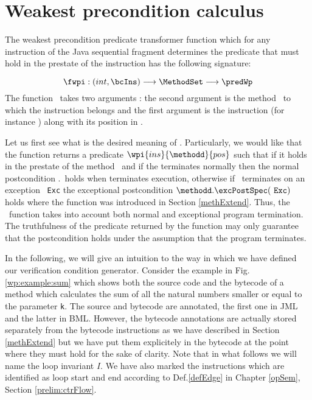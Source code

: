  


\section{Weakest precondition calculus} \label{wpRules}


The weakest precondition predicate transformer function which for any instruction of the Java sequential fragment
determines the predicate that must hold in the prestate of the instruction has the following signature:

$$ \fwpi :   (int,\bcIns)  \longrightarrow   \MethodSet   \longrightarrow \predWp $$
The function \fwpi \ takes two arguments : 
the second argument is the method \methodd \ to which the  instruction belongs
and  the first argument is  the instruction (for instance  \putfield) along with its position in \methodd.

Let us first see what is the desired meaning of \fwpi.
Particularly, we would like that the function \fwpi{}  returns a predicate $\wpi{ins}{\methodd}{pos}$
such that  if it holds in the prestate of the method \methodd \  and if the
\methodd{} terminates normally then the normal postcondition \methodd.\normalPost \ holds when 
\methodd{} terminates execution, otherwise if \methodd \ terminates on an exception
\mbox{ \rm \texttt{Exc}} the exceptional postcondition  $\methodd.\excPostSpec(\mbox{ \rm \texttt{Exc}})$ holds where the function \excPostSpec{} was
introduced in Section \ref{methExtend}. Thus, the \fwpi \ function takes into account both normal and exceptional
program termination. The truthfulness of the predicate returned by the \fwpi{} function
may only guarantee that the postcondition holds under the assumption that the program terminates.
 
 In the following, we will give an intuition to the way in which we have defined our verification condition generator.
 Consider the example in Fig. \ref{wp:example:sum} which 
 shows both the source code and the bytecode of a method which calculates the sum of all the natural numbers
 smaller or equal to the parameter \lstinline!k!. The source and bytecode are annotated, the first one in JML and the latter in BML.
 However, the bytecode annotations are actually stored separately from the bytecode instructions as we have described in Section \ref{methExtend}
 but we have put them explicitely in the bytecode at the point where they must hold for the sake of clarity. 
 Note that in what follows we will name the loop invariant $I$.
 We have also marked the instructions which are identified as loop start and end
 according to Def.\ref{defEdge} in Chapter \ref{opSem}, Section \ref{prelim:ctrFlow}. 


